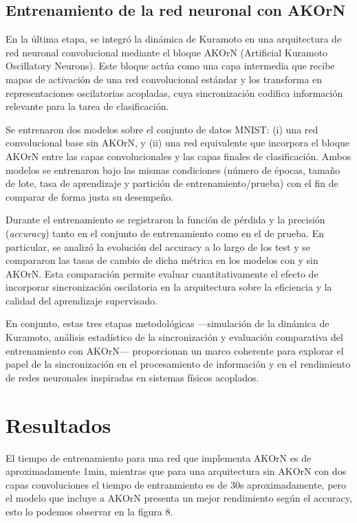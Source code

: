 \documentclass[12pt]{article}
\begin{document}
\subsection{Entrenamiento de la red neuronal con AKOrN}

En la última etapa, se integró la dinámica de Kuramoto en una arquitectura de red neuronal convolucional mediante el bloque AKOrN (Artificial Kuramoto Oscillatory Neurons). Este bloque actúa como una capa intermedia que recibe mapas de activación de una red convolucional estándar y los transforma en representaciones oscilatorias acopladas, cuya sincronización codifica información relevante para la tarea de clasificación.

Se entrenaron dos modelos sobre el conjunto de datos MNIST: (i) una red convolucional base sin AKOrN, y (ii) una red equivalente que incorpora el bloque AKOrN entre las capas convolucionales y las capas finales de clasificación. Ambos modelos se entrenaron bajo las mismas condiciones (número de épocas, tamaño de lote, tasa de aprendizaje y partición de entrenamiento/prueba) con el fin de comparar de forma justa su desempeño.

Durante el entrenamiento se registraron la función de pérdida y la precisión (\emph{accuracy}) tanto en el conjunto de entrenamiento como en el de prueba. En particular, se analizó la evolución del accuracy a lo largo de los test y se compararon las tasas de cambio de dicha métrica en los modelos con y sin AKOrN. Esta comparación permite evaluar cuantitativamente el efecto de incorporar sincronización oscilatoria en la arquitectura sobre la eficiencia y la calidad del aprendizaje supervisado.

En conjunto, estas tres etapas metodológicas —simulación de la dinámica de Kuramoto, análisis estadístico de la sincronización y evaluación comparativa del entrenamiento con AKOrN— proporcionan un marco coherente para explorar el papel de la sincronización en el procesamiento de información y en el rendimiento de redes neuronales inspiradas en sistemas físicos acoplados.



\section{Resultados}%
El tiempo de entrenamiento para una red que implementa AKOrN es de aproximadamente
1min, mientras que para una arquitectura sin AKOrN con dos capas convoluciones el tiempo
de entranmiento es de 30s aproximadamente, pero el modelo que incluye a AKOrN presenta
un mejor rendimiento según el accuracy, esto lo podemos observar en la figura 8. \\
\end{document}
